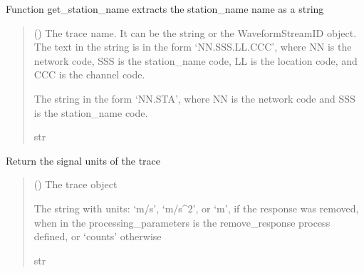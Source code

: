 \documentclass[letterpaper,10pt,english]{sphinxmanual}
\begin{document}
\begin{fulllineitems}
\label{\detokenize{api_core:amw.core.utils.get_station_name}}
\pysigstartsignatures
{}
\pysigstopsignatures
\sphinxAtStartPar
Function get\_station\_name extracts the station\_name name as a string
\begin{quote}\begin{description}
\sphinxAtStartPar
{} () \textendash{} The trace name. It can be the string or the WaveformStreamID object.
The text in the string is in the form ‘NN.SSS.LL.CCC’, where NN is the network code,
SSS is the station\_name code, LL is the location code, and CCC is the channel code.

\sphinxAtStartPar
The string in the form ‘NN.STA’, where NN is the network code and SSS is the station\_name code.

\sphinxAtStartPar
str

\end{description}\end{quote}

\end{fulllineitems}


\begin{fulllineitems}
\label{\detokenize{api_core:amw.core.utils.get_units}}
\pysigstartsignatures
{}
\pysigstopsignatures
\sphinxAtStartPar
Return the signal units of the trace
\begin{quote}\begin{description}
\sphinxAtStartPar
{} () \textendash{} The trace object

\sphinxAtStartPar
The string with units: ‘m/s’, ‘m/s\textasciicircum{}2’, or ‘m’, if the response was removed,
when in the processing\_parameters is the remove\_response process defined,
or ‘counts’ otherwise

\sphinxAtStartPar
str

\end{description}\end{quote}

\end{fulllineitems}
\end{document}
